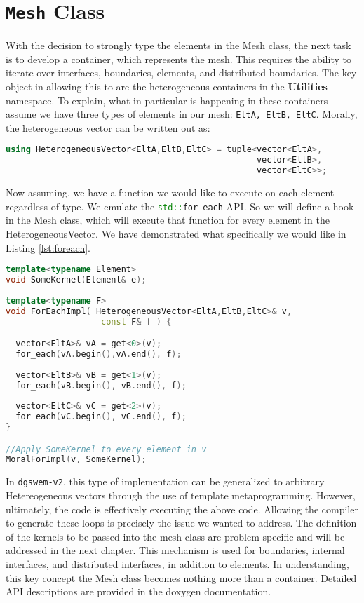\section{\texttt{Mesh} Class}
With the decision to strongly type the elements in the Mesh class, the next task is to develop a container, which represents the mesh. This requires the ability to iterate over interfaces, boundaries, elements, and distributed boundaries. The key object in allowing this to are the heterogeneous containers in the \textbf{Utilities} namespace. To explain, what in particular is happening in these containers assume we have three types of elements in our mesh: \lstinline{EltA, EltB, EltC}.
Morally, the heterogeneous vector can be written out as:
\begin{lstlisting}[language=c++]
using HeterogeneousVector<EltA,EltB,EltC> = tuple<vector<EltA>,
                                                  vector<EltB>,
                                                  vector<EltC>>;
\end{lstlisting}
Now assuming, we have a function we would like to execute on each element regardless of type. We emulate the \lstinline[language=c++]{std::for_each} API. So we will define a hook in the Mesh class, which will execute that function for every element in the HeterogeneousVector. We have demonstrated what specifically we would like in Listing \ref{lst:foreach}.
\begin{lstlisting}[language=c++,
                   caption={Moral implementation of iterating over HeterogeneousVector},
                   label=lst:foreach]
template<typename Element>
void SomeKernel(Element& e);                   
                   
template<typename F>
void ForEachImpl( HeterogeneousVector<EltA,EltB,EltC>& v,
                   const F& f ) {

  vector<EltA>& vA = get<0>(v);
  for_each(vA.begin(),vA.end(), f);
  
  vector<EltB>& vB = get<1>(v);
  for_each(vB.begin(), vB.end(), f);
  
  vector<EltC>& vC = get<2>(v);
  for_each(vC.begin(), vC.end(), f);
}

//Apply SomeKernel to every element in v
MoralForImpl(v, SomeKernel);
\end{lstlisting}
In \texttt{dgswem-v2}, this type of implementation can be generalized to arbitrary Hetereogeneous vectors through the use of template metaprogramming. However, ultimately, the code is effectively executing the above code. Allowing the compiler to generate these loops is precisely the issue we wanted to address. The definition of the kernels to be passed into the mesh class are problem specific and will be addressed in the next chapter. This mechanism is used for boundaries, internal interfaces, and distributed interfaces, in addition to elements. In understanding, this key concept the Mesh class becomes nothing more than a container. Detailed API descriptions are provided in the doxygen documentation.